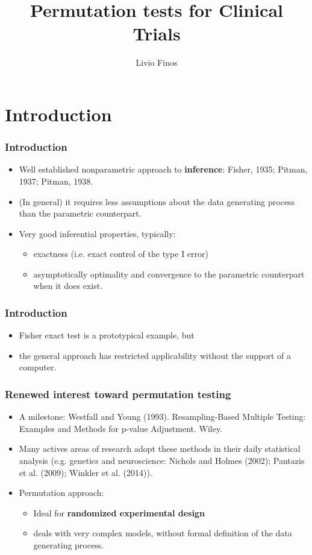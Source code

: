 \documentclass[xcolor={pdftex,dvipsnames,table}]{beamer}
\title{Permutation tests for Clinical Trials}
\author{Livio Finos}
\date{}%
\newcommand{\bi}{\begin {itemize}}
\newcommand{\ei}{\end{itemize}}
\newcommand{\bfr}[1]{\begin{frame} \frametitle{#1}}
\begin{document}
\begin{frame}
\titlepage
\end{frame}

\section{Introduction}

\bfr{Introduction}
\bi
\item Well established nonparametric approach to {\bf inference}: Fisher, 1935; Pitman, 1937; Pitman, 1938. 
\item (In general) it requires less assumptions about the data generating process than the parametric counterpart. 
\item Very good inferential properties, typically:
 \bi 
 \item exactness (i.e. exact control of the type I error)
 \item asymptotically optimality and convergence to the parametric counterpart when it does exist.
\ei
\ei

\end{frame}
\bfr{Introduction}
\bi
\item Fisher exact test is a prototypical example, but
\item  the general approach has restricted applicability without the support of a computer. %
\ei
\end{frame}
\bfr{Renewed interest toward permutation testing}
\bi
\item A milestone: Westfall and Young (1993). Resampling-Based Multiple Testing: 
Examples and Methods for p-value Adjustment. Wiley.
\item Many actives areas of research adopt these methods in their daily statistical analysis (e.g. genetics and neuroscience: Nichols and Holmes (2002); Pantazis et al. (2009); Winkler et al. (2014)).
\item Permutation approach:
\bi 
\item Ideal for {\bf randomized experimental design}
\item deals with very complex
models,  without formal definition of the data generating process.
\ei
\ei

\end{frame}
\end{document}

